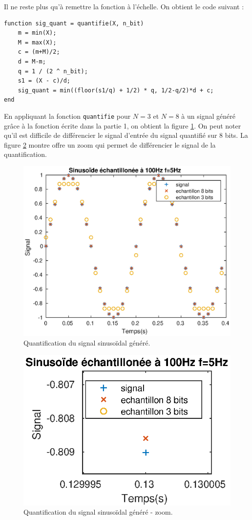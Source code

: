 \documentclass[french]{article}
\begin{document}
Il ne reste plus qu'à remettre la fonction à l'échelle. On obtient le code suivant :

\lstset{language=matlab}
\begin{lstlisting}
function sig_quant = quantifie(X, n_bit)
    m = min(X);
    M = max(X);
    c = (m+M)/2;
    d = M-m;
    q = 1 / (2 ^ n_bit);
    s1 = (X - c)/d;
    sig_quant = min((floor(s1/q) + 1/2) * q, 1/2-q/2)*d + c;
end
\end{lstlisting}
En appliquant la fonction \verb`quantifie` pour $N=3$ et $N=8$ à un signal généré grâce à la fonction écrite dans la partie 1, on obtient la figure \ref{signalBruit}. On peut noter qu'il est difficile de différencier le signal d'entrée du signal quantifié sur 8 bits. La figure \ref{signalBruit2} montre offre un zoom qui permet de différencier le signal de la quantification.

\begin{figure}[h!]
\centering
\includegraphics{images/signalBruit.eps}
\caption{Quantification du signal sinusoïdal généré.}
\label{signalBruit}
\end{figure}
\begin{figure}[h!]
	\centering
	\includegraphics{images/signalBruit1.eps}
	\caption{Quantification du signal sinusoïdal généré - zoom.}
	\label{signalBruit2}
\end{figure}
\end{document}
